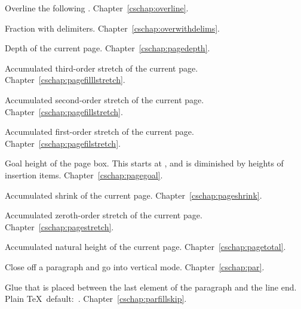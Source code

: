 \begin{glossinventory}
\item [\cs{overline\gr{math field}}]
      Overline the following .
Chapter~\ref{cschap:overline}.

\item [\cs{overwithdelims\gr{delim$_1$}\gr{delim$_2$}}]
      Fraction with delimiters.
Chapter~\ref{cschap:overwithdelims}.

\item [\cs{pagedepth}]
      Depth of the current page.
Chapter~\ref{cschap:pagedepth}.

\item [\cs{pagefilllstretch}]
      Accumulated third-order stretch of the current page.
Chapter~\ref{cschap:pagefilllstretch}.

\item [\cs{pagefillstretch}]
      Accumulated second-order stretch of the current page.
Chapter~\ref{cschap:pagefillstretch}.

\item [\cs{pagefilstretch}]
      Accumulated first-order stretch of the current page.
Chapter~\ref{cschap:pagefilstretch}.

\item [\cs{pagegoal}]
      Goal height of the page box. This starts at ,
      and is diminished by heights of insertion items.
Chapter~\ref{cschap:pagegoal}.

\item [\cs{pageshrink}]
      Accumulated shrink of the current page.
Chapter~\ref{cschap:pageshrink}.

\item [\cs{pagestretch}]
      Accumulated zeroth-order stretch of the current page.
Chapter~\ref{cschap:pagestretch}.

\item [\cs{pagetotal}]
      Accumulated natural height of the current page.
Chapter~\ref{cschap:pagetotal}.

\item [\cs{par}]
      Close off a paragraph and go into vertical mode.
Chapter~\ref{cschap:par}.

\item [\cs{parfillskip}]
      Glue that is placed between the last          
      element of the paragraph and the line end.
      Plain \TeX\ default:~.
Chapter~\ref{cschap:parfillskip}.


\end{glossinventory}

